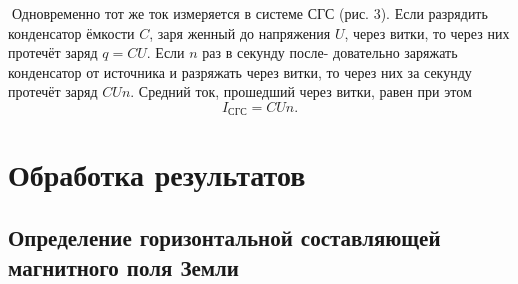 \documentclass[a4paper,12pt]{article} %
\theoremstyle{plain} %
\theoremstyle{definition} %
\theoremstyle{remark} %
\begin{document}
Одновременно тот же ток измеряется в системе СГС (рис. 3). Если разрядить конденсатор ёмкости $C$, заря
женный до напряжения $U$, через витки, то через них протечёт заряд $q=CU$. Если $n$ раз в секунду после-
довательно заряжать конденсатор от источника и разряжать через витки,
то через них за секунду протечёт заряд $CUn$. Средний ток, прошедший
через витки, равен при этом
\begin{equation}
I_{\text{СГС}}=CUn.
\end{equation}




\section{Обработка результатов}

\subsection{Определение горизонтальной составляющей магнитного поля Земли}
\end{document}
